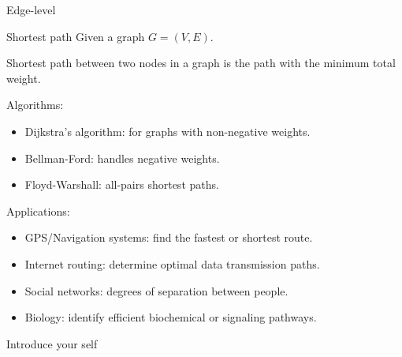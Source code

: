 \documentclass[aspectratio=169]{beamer}
\begin{document}
    \begin{frame}{Edge-level}
        \begin{exampleblock}{Shortest path}
            Given a graph $G = (V, E)$.
            
            Shortest path between two nodes in a graph is the path with the minimum total weight.
        \end{exampleblock}
        
        Algorithms:
        \begin{itemize}
            \item Dijkstra's algorithm: for graphs with non-negative weights.
            \item Bellman-Ford: handles negative weights.
            \item Floyd-Warshall: all-pairs shortest paths.
        \end{itemize}

        Applications:
        \begin{itemize}
            \item GPS/Navigation systems: find the fastest or shortest route.
            \item Internet routing: determine optimal data transmission paths.
            \item Social networks: degrees of separation between people.
            \item Biology: identify efficient biochemical or signaling pathways.
        \end{itemize}

        \begin{note}
            {Introduce your self}
        \end{note}
    \end{frame}
\end{document}
